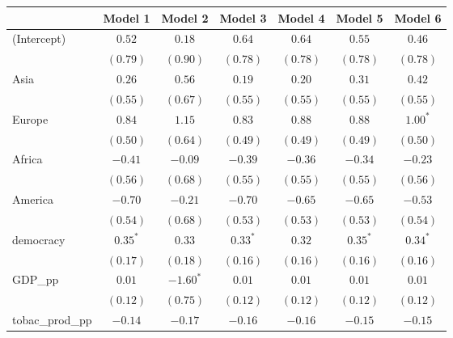 
\begin{table}[!h]
\begin{center}
\begin{tabular}{l c c c c c c }
\toprule
 & Model 1 & Model 2 & Model 3 & Model 4 & Model 5 & Model 6 \\
\midrule
(Intercept)             & $0.52$       & $0.18$       & $0.64$       & $0.64$       & $0.55$       & $0.46$       \\
                        & $(0.79)$     & $(0.90)$     & $(0.78)$     & $(0.78)$     & $(0.78)$     & $(0.78)$     \\
Asia                    & $0.26$       & $0.56$       & $0.19$       & $0.20$       & $0.31$       & $0.42$       \\
                        & $(0.55)$     & $(0.67)$     & $(0.55)$     & $(0.55)$     & $(0.55)$     & $(0.55)$     \\
Europe                  & $0.84$       & $1.15$       & $0.83$       & $0.88$       & $0.88$       & $1.00^{*}$   \\
                        & $(0.50)$     & $(0.64)$     & $(0.49)$     & $(0.49)$     & $(0.49)$     & $(0.50)$     \\
Africa                  & $-0.41$      & $-0.09$      & $-0.39$      & $-0.36$      & $-0.34$      & $-0.23$      \\
                        & $(0.56)$     & $(0.68)$     & $(0.55)$     & $(0.55)$     & $(0.55)$     & $(0.56)$     \\
America                 & $-0.70$      & $-0.21$      & $-0.70$      & $-0.65$      & $-0.65$      & $-0.53$      \\
                        & $(0.54)$     & $(0.68)$     & $(0.53)$     & $(0.53)$     & $(0.53)$     & $(0.54)$     \\
democracy               & $0.35^{*}$   & $0.33$       & $0.33^{*}$   & $0.32$       & $0.35^{*}$   & $0.34^{*}$   \\
                        & $(0.17)$     & $(0.18)$     & $(0.16)$     & $(0.16)$     & $(0.16)$     & $(0.16)$     \\
GDP\_pp                 & $0.01$       & $-1.60^{*}$  & $0.01$       & $0.01$       & $0.01$       & $0.01$       \\
                        & $(0.12)$     & $(0.75)$     & $(0.12)$     & $(0.12)$     & $(0.12)$     & $(0.12)$     \\
tobac\_prod\_pp         & $-0.14$      & $-0.17$      & $-0.16$      & $-0.16$      & $-0.15$      & $-0.15$      \\

\end{tabular}
\end{center}
\end{table}
